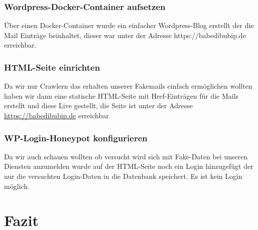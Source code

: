 \documentclass[a4paper,11pt,singlespacing]{article}
\begin{document}
		\subsubsection{Wordpress-Docker-Container aufsetzen}\label{}
			Über einen Docker-Container wurde ein einfacher Wordpress-Blog erstellt der die Mail Einträge beinhaltet, dieser war unter der Adresse https://babedibubip.de erreichbar.
			
		\subsubsection{HTML-Seite einrichten}\label{}
			Da wir nur Crawlern das erhalten unserer Fakemails einfach ermöglichen wollten haben wir dann eine statische HTML-Seite mit Href-Einträgen für die Mails erstellt und diese Live gestellt, die Seite ist unter der Adresse \url{https://babedibubip.de} erreichbar.

		\subsubsection{WP-Login-Honeypot konfigurieren}\label{}
			Da wir auch schauen wollten ob versucht wird sich mit Fake-Daten bei unseren Diensten anzumelden wurde auf der HTML-Seite noch ein Login hinzugefügt der nur die versuchten Login-Daten in die Datenbank speichert. Es ist kein Login möglich.
	
\section{Fazit}\label{sec:Fazit}


\newpage




\listoffigures
{}

\lstlistoflistings
{}
	
	
	
\end{document}
